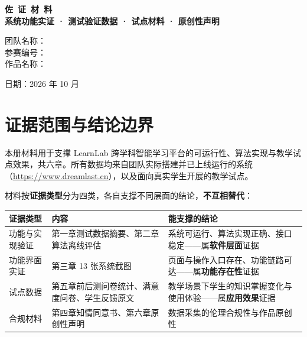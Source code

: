 \documentclass[zihao=-4,a4paper,UTF8,fontset=windows]{ctexart}
\begin{document}
\begin{titlepage}
\thispagestyle{cover}
\vspace*{2.8cm}
\begin{center}
{\bfseries{} 佐\ 证\ 材\ 料}\\[1.2em]
{\bfseries{} 系统功能实证 · 测试验证数据 · 试点材料 · 原创性声明}\\[3em]
\end{center}
\vspace{4em}
\begin{flushleft}
\hspace*{4em}
团队名称：\underline{}\\[0.8em]
\hspace*{4em}参赛编号：\underline{}\\[0.8em]
\hspace*{4em}作品名称：\underline{}\\
\end{flushleft}
\vfill
\begin{center} 日期：2026 年 10 月\end{center}
\vspace*{1.5cm}
\end{titlepage}
\setcounter{page}{1}

\section{证据范围与结论边界}

本册材料用于支撑 LearnLab 跨学科智能学习平台的可运行性、算法实现与教学试点效果，共六章。所有数据均来自团队实际搭建并已上线运行的系统（\url{https://www.dreamlast.cn}），以及面向真实学生开展的教学试点。

材料按\textbf{证据类型}分为四类，各自支撑不同层面的结论，\textbf{不互相替代}：

\par\noindent\begin{tabular}{|p{3.0cm}|p{5.2cm}|p{5.4cm}|}
\hline
\textbf{证据类型} & \textbf{内容} & \textbf{能支撑的结论} \\ \hline
功能与实现验证 & 第一章测试数据摘要、第二章算法离线评估 & 系统可运行、算法实现正确、接口稳定——属\textbf{软件层面}证据 \\ \hline
功能界面实证 & 第三章 13 张系统截图 & 页面与操作入口存在、功能链路可达——属\textbf{功能存在性}证据 \\ \hline
试点数据 & 第五章前后测问卷统计、满意度问卷、学生反馈原文 & 教学场景下学生的知识掌握变化与使用体验——属\textbf{应用效果}证据 \\ \hline
合规材料 & 第四章知情同意书、第六章原创性声明 & 数据采集的伦理合规性与作品原创性 \\ \hline
\end{tabular}\par
\end{document}
